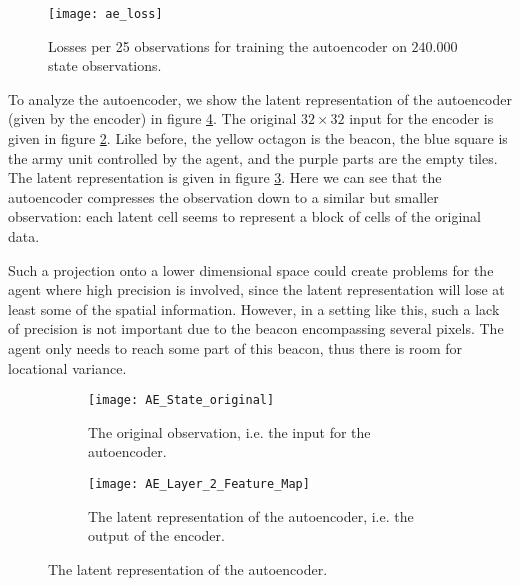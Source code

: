\begin{figure}[h!]
    \centering
    \texttt{[image: ae\_loss]}
    \caption{Losses per 25 observations for training the autoencoder on $240.000$ state observations.}
    \label{fig:ae-loss}
\end{figure}

To analyze the autoencoder, we show the latent representation of the autoencoder (given by the encoder) in figure \ref{fig:ae-featuremap}. The original $32 \times 32$ input for the encoder is given in figure \ref{fig:ae-featuremap-original}. Like before, the yellow octagon is the beacon, the blue square is the army unit controlled by the agent, and the purple parts are the empty tiles. The latent representation is given in figure \ref{fig:ae-featuremap-layer2}. Here we can see that the autoencoder compresses the observation down to a similar but smaller observation: each latent cell seems to represent a block of cells of the original data. 

Such a projection onto a lower dimensional space could create problems for the agent where high precision is involved, since the latent representation will lose at least some of the spatial information. However, in a setting like this, such a lack of precision is not important due to the beacon encompassing several pixels. The agent only needs to reach some part of this beacon, thus there is room for locational variance. 

\begin{figure}[h!]
	\centering
	\begin{subfigure}[b]{0.30\textwidth}
		\texttt{[image: AE\_State\_original]}
		\caption{The original observation, i.e. the input for the autoencoder.}
		\label{fig:ae-featuremap-original} 
	\end{subfigure}\hfill
	\begin{subfigure}[b]{0.30\textwidth}
		\texttt{[image: AE\_Layer\_2\_Feature\_Map]}
		\caption{The latent representation of the autoencoder, i.e. the output of the encoder.}
		\label{fig:ae-featuremap-layer2}
	\end{subfigure}
	\caption{The latent representation of the autoencoder.}
	\label{fig:ae-featuremap}
\end{figure}

